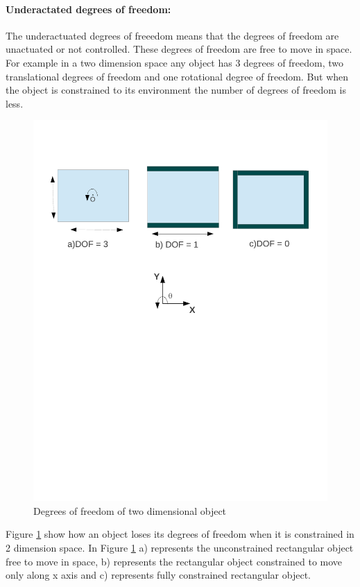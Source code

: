  \paragraph{Underactated degrees of freedom:}
    The underactuated degrees of freeedom means that the degrees of freedom are unactuated or not controlled. These degrees of freedom are free to move in space. For example in a two dimension space any object has 3 degrees of freedom, two translational degrees of freedom and one rotational degree of freedom. But when the object is constrained to its environment the number of degrees of freedom is less.
    \begin{figure}[H]
    \begin{center}
    \includegraphics[trim = 0mm 130mm 0mm 20mm, scale = 0.75 ]{Bilder/dof2d.pdf}
    \caption{ Degrees of freedom of two dimensional object}
    \label{fig:dof_2d}
    \end{center}
    \end{figure}
    Figure \ref{fig:dof_2d} show how an object loses its degrees of freedom when it is constrained in 2 dimension space. In Figure \ref{fig:dof_2d} a) represents the unconstrained rectangular object free to move in space, b) represents the rectangular object constrained to move only along x axis and c) represents fully constrained rectangular object. 
    
